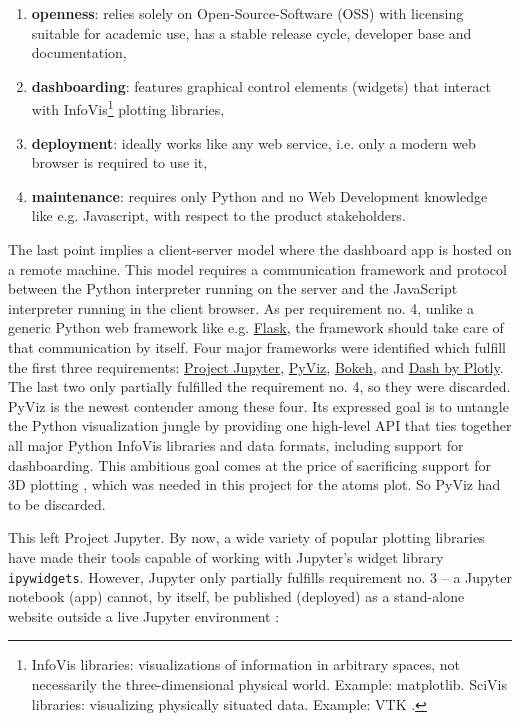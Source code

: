 \begin{enumerate}
\item \textbf{openness}: relies solely on Open-Source-Software (OSS) with
    licensing suitable for academic use, has a stable release cycle, developer
    base and documentation,
\item \textbf{dashboarding}: features graphical control elements (widgets) that
    interact with InfoVis\footnote{InfoVis libraries: visualizations of
      information in arbitrary spaces, not necessarily the three-dimensional
      physical world. Example: matplotlib. SciVis libraries: visualizing
      physically situated data. Example: VTK \cite{python-viz-2018}.} plotting
    libraries,
\item \textbf{deployment}: ideally works like any web service, i.e. only a
    modern web browser is required to use it,
\item \textbf{maintenance}: requires only Python and no Web Development
    knowledge like e.g. Javascript, with respect to the product stakeholders.
\end{enumerate}

The last point implies a client-server model where the dashboard app is hosted
on a remote machine. This model requires a communication framework and protocol
between the Python interpreter running on the server and the JavaScript
interpreter running in the client browser. As per requirement no. 4, unlike a
generic Python web framework like e.g. \href{http://flask.pocoo.org/}{Flask},
the framework should take care of that communication by itself. Four major
frameworks were identified which fulfill the first three requirements:
\href{https://jupyter.org/}{Project Jupyter}, \href{http://pyviz.org/}{PyViz},
\href{https://bokeh.pydata.org/en/latest/}{Bokeh}, and
\href{https://plot.ly/products/dash/}{Dash by Plotly}. The last two only
partially fulfilled the requirement no. 4, so they were discarded. PyViz is the
newest contender among these four. Its expressed goal is to untangle the Python
visualization jungle by providing one high-level API that ties together all
major Python InfoVis libraries and data formats, including support for
dashboarding. This ambitious goal comes at the price of sacrificing support for
3D plotting \cite{pyviz-faq}, which was needed in this project for the atoms
plot. So PyViz had to be discarded.

This left Project Jupyter. By now, a wide variety of popular plotting libraries
have made their tools capable of working with Jupyter's widget library
\texttt{ipywidgets}. However, Jupyter only partially fulfills requirement no. 3
-- a Jupyter notebook (app) cannot, by itself, be published (deployed) as a
stand-alone website outside a live Jupyter environment \cite{python-viz-2018}:

